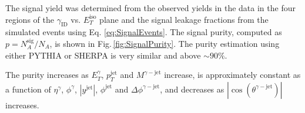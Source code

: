 \documentclass[12pt, twoside]{article}
\numberwithin{equation}{section}
\numberwithin{figure}{section}
\begin{document}
The signal yield was determined from the observed yields in the data in the four regions of the $\gamma_{\text{ID}}$ vs. $E^{\text{iso}}_{T}$ plane and the signal leakage fractions from the simulated events using Eq. \ref{eq:SignalEvents}. The signal purity, computed as $p = N^{\text{sig}}_{A} / N_{A}$, is shown in Fig.\,\ref{fig:SignalPurity}. The purity estimation using either PYTHIA or SHERPA is very similar and above $\sim 90\%$.

The purity increases as $E^{\gamma}_{T}$, $p^{\text{jet}}_{T}$ and $M^{\gamma-\text{jet}}$ increase, is approximately constant as a function of $\eta^{\gamma}$, $\phi^{\gamma}$, $\left| y^{\text{jet}} \right|$, $\phi^{\text{jet}}$ and $\Delta \phi^{\gamma-\text{jet}}$, and decreases as $\left| \cos \left( \theta^{\gamma-\text{jet}} \right) \right|$ increases.
\end{document}
